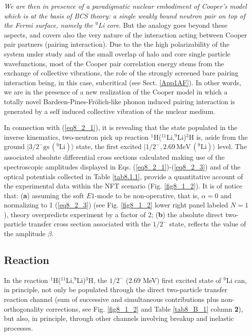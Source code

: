 \textit{We are then in presence of a paradigmatic nuclear embodiment of Cooper's model which is at the basis of BCS theory: a single weakly bound neutron pair on top of the Fermi surface, namely the  ${}^9$Li core}. But the analogy goes beyond these aspects, and covers also the very nature of the interaction acting between Cooper pair partners  (pairing interaction). Due to the  the high polarizability of the system under study and of the small overlap of halo and core single particle wavefunctions, most of the Cooper pair correlation energy stems from the exchange of collective vibrations, the role of the strongly screened bare pairing interaction being, in this case, subcritical  (see Sect. \ref{App1AF}). In other words, we are in the presence of a new realization of the Cooper model in which a totally novel Bardeen-Pines-Fr\"olich-like phonon induced pairing interaction is generated by a self induced collective vibration of the nuclear medium.



 In connection with  (\ref{eq8_2_1}), it is revealing that the  state populated in the  inverse kinematics, two-neutron pick up reaction $^1$H($^{11}$Li,$^9$Li)$^3$H is, aside from the ground $|3/2^-\text{gs}\,(^9\text{Li})\rangle$ state,  the first excited $|1/2^-,2.69\,\text{MeV}\,(^9\text{Li})\rangle$ level. The associated absolute differential cross sections calculated making use of the spectroscopic amplitudes displayed in Eqs. (\ref{eq8_2_1})-(\ref{eq8_2_3}) and of the optical potentials collected in Table \ref{tab8.1.1}, provide a quantitative account of the experimental data  within the NFT scenario (Fig. \ref{fig8_1_2}). It is of notice that: (\textbf{a}) assuming the soft $E1$-mode to be non-operative, that is, $\alpha=0$ and normalizing to 1 (\ref{eq8_2_3}) (see Fig. \ref{fig8_1_2} lower right panel labeled $N=1$), theory overpredicts experiment by a factor of 2; (\textbf{b}) the absolute direct two-particle transfer cross section associated with the $1/2^-$ state, reflects the value of the amplitude $\beta$. 
 
 
 
 
 
 \subsection{Reaction}\label{C8AppB}
 In the reaction $^1$H($^{11}$Li,$^9$Li)$^3$H,
 the $1/2^-$ (2.69 MeV) first excited state of $^9$Li can, in principle, not only be populated through the direct two-particle transfer reaction channel (sum of successive and simultaneous contributions plus non-orthogonality corrections, see Fig. \ref{fig8_1_2} and Table \ref{tab8_B_1} column \textbf{2}), but also, in principle, through other channels involving breakup and inelastic processes.
 
